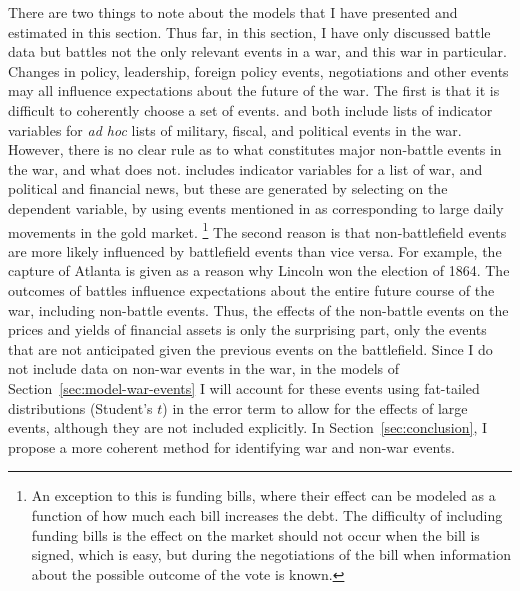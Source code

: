 There are two things to note about the models that I have presented and estimated in this section.
Thus far, in this section, I have only discussed battle data but battles not the only relevant events in a war, and this war in particular.
Changes in policy, leadership, foreign policy events, negotiations and other events may all influence expectations about the future of the war.
The first is that it is difficult to coherently choose a set of events.
\textcite{McCandless1996} and \textcite{SmithSmith1997} both include lists of indicator variables for \textit{ad hoc} lists of military, fiscal, and political events in the war.
However, there is no clear rule as to what constitutes major non-battle events in the war, and what does not.
\textcite{SmithSmith1997} includes indicator variables for a list of war, and political and financial news, but these are generated by selecting on the dependent variable, by using events mentioned in \textcite{Mitchell1903} as corresponding to large daily movements in the gold market.%
\footnote{
  An exception to this is funding bills, where their effect can be modeled as a function of how much each bill increases the debt.
  The difficulty of including funding bills is the effect on the market should not occur when the bill is signed, which is easy, but during the negotiations of the bill when information about the possible outcome of the vote is known.
}
The second reason is that non-battlefield events are more likely influenced by battlefield events than vice versa.
For example, the capture of Atlanta is given as a reason why Lincoln won the election of 1864.
The outcomes of battles influence expectations about the entire future course of the war, including non-battle events.
Thus, the effects of the non-battle events on the prices and yields of financial assets is only the surprising part, only the events that are not anticipated given the previous events on the battlefield.
Since I do not include data on non-war events in the war, in the models of Section~\ref{sec:model-war-events} I will account for these events using fat-tailed distributions (Student's $t$) in the error term to allow for the effects of large events, although they are not included explicitly.
In Section~\ref{sec:conclusion}, I propose a more coherent method for identifying war and non-war events.


